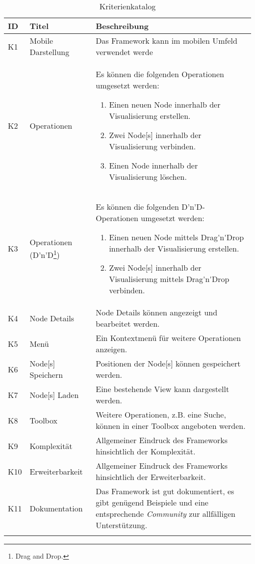 \begin{longtable}{|p{1cm}| P{3cm} | P{8.1cm}|}
  \hline
    ID & Titel & Beschreibung \\\hline
    K1 & Mobile Darstellung & Das \gls{Framework} kann im mobilen Umfeld verwendet werde\\\hline
    K2 & Operationen & Es können die folgenden Operationen umgesetzt werden:
        \begin{enumerate}
          \item Einen neuen \gls{Node} innerhalb der Visualisierung erstellen.
          \item Zwei \gls{Node}[s] innerhalb der Visualisierung verbinden.
          \item Einen \gls{Node} innerhalb der Visualisierung löschen.
        \end{enumerate} \\\hline
    K3 & Operationen (D'n'D\footnote{Drag and Drop.}) & Es können die folgenden D'n'D-Operationen umgesetzt werden:
        \begin{enumerate}
          \item Einen neuen \gls{Node} mittels \gls{Drag'n'Drop} innerhalb der Visualisierung erstellen.
          \item Zwei \gls{Node}[s] innerhalb der Visualisierung mittels \gls{Drag'n'Drop} verbinden.
        \end{enumerate} \\\hline
    K4 & \gls{Node} Details & \gls{Node} Details können angezeigt und bearbeitet werden.\\\hline
    K5 & Menü & Ein Kontextmenü für weitere Operationen anzeigen.\\\hline
    K6 & \gls{Node}[s] Speichern & Positionen der \gls{Node}[s] können gespeichert werden.\\\hline
    K7 & \gls{Node}[s] Laden & Eine bestehende View kann dargestellt werden.\\\hline
    K8 & \gls{Toolbox} & Weitere Operationen, z.B. eine Suche, können in einer \gls{Toolbox} angeboten werden.\\\hline
    K9 & Komplexität & Allgemeiner Eindruck des \gls{Framework}s hinsichtlich der Komplexität.\\\hline
    K10 & Erweiterbarkeit & Allgemeiner Eindruck des \gls{Framework}s hinsichtlich der Erweiterbarkeit.\\\hline
    K11 & Dokumentation & Das \gls{Framework} ist gut dokumentiert, es gibt genügend Beispiele und eine entsprechende \textit{Community} zur allfälligen Unterstützung.\\\hline
    \caption{Kriterienkatalog}
  \label{tab:kriterien-katalog}
\end{longtable}
